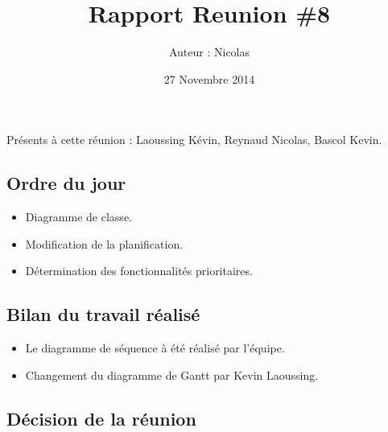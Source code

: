 \documentclass[12pt,a4paper]{article}
\title{Rapport Reunion \#8}
\author{Auteur : Nicolas \bsc{REYNAUD}}
\date{27 Novembre 2014}
\begin{document}
\maketitle

\newpage

Présents à cette réunion : Laoussing Kévin, Reynaud Nicolas, Bascol Kevin.\\


\subsection*{Ordre du jour}
\begin{itemize}[label = $\ast$]
\item Diagramme de classe.
\item Modification de la planification.
\item Détermination des fonctionnalités prioritaires.
\end{itemize}

\subsection*{Bilan du travail réalisé}

\begin{itemize}[label = $\ast$]
	\item Le diagramme de séquence à été réalisé par l'équipe.
	\item Changement du diagramme de Gantt par Kevin Laoussing.
\end{itemize}


\subsection*{Décision de la réunion}
\end{document}
